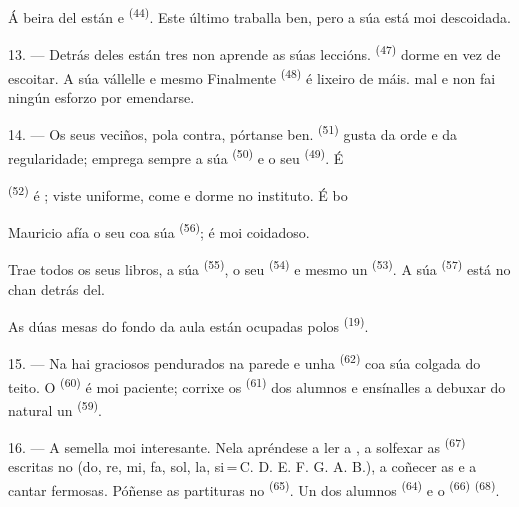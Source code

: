 Á beira del están  e  \textsuperscript{(44)}. Este
último traballa ben, pero a súa  está moi descoidada.

13. --- Detrás deles están tres  non aprende as súas
leccións.  \textsuperscript{(47)} dorme en vez de escoitar. A súa
 vállelle  e mesmo  Finalmente
 \textsuperscript{(48)} é lixeiro de máis.
 mal e non fai ningún esforzo por emendarse.

14. --- Os seus veciños, pola contra, pórtanse ben. 
\textsuperscript{(51)} gusta da orde e da regularidade; emprega sempre a súa
 \textsuperscript{(50)} e o seu  \textsuperscript{(49)}.
É 

 \textsuperscript{(52)} é ; viste uniforme, come e
dorme no instituto. É bo 

Mauricio afía o seu  coa súa 
\textsuperscript{(56)}; é moi coidadoso.

Trae todos os seus libros, a súa  \textsuperscript{(55)}, o seu
 \textsuperscript{(54)} e mesmo un 
\textsuperscript{(53)}. A súa  \textsuperscript{(57)} está no chan
detrás del.

As dúas mesas do fondo da aula están ocupadas polos 
\textsuperscript{(19)}.

\VUsaut{4.6mm}
\VUsaut{3.4mm}

15. --- Na  hai  graciosos pendurados na
parede e unha  \textsuperscript{(62)} coa súa 
colgada do teito. O  \textsuperscript{(60)} é moi paciente; corrixe os
 \textsuperscript{(61)} dos alumnos e ensínalles a debuxar do natural
un  \textsuperscript{(59)}.

16. --- A  semella moi interesante. Nela apréndese a ler a
, a solfexar as  \textsuperscript{(67)}
escritas no  (do, re, mi, fa, sol, la,
si\,=\,C. D. E. F. G. A. B.), a coñecer as  e a cantar
 fermosas. Póñense as partituras no 
\textsuperscript{(65)}. Un dos alumnos 
\textsuperscript{(64)} e o  \textsuperscript{(66)}
 \textsuperscript{(68)}.

